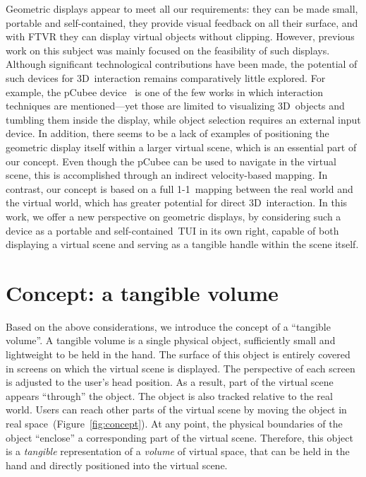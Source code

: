 \documentclass{vgtc}                         \havecopyrightspacefalse
\begin{document}
Geometric displays appear to meet all our requirements: they can be made small, portable and self-contained, they provide visual feedback on all their surface, and with FTVR they can display virtual objects without clipping. However, previous work on this subject was mainly focused on the feasibility of such displays. Although significant technological contributions have been made, the potential of such devices for 3D~interaction remains comparatively little explored. For example, the pCubee device~\cite{stavness10} is one of the few works in which interaction techniques are mentioned---yet those are limited to visualizing 3D~objects and tumbling them inside the display, while object selection requires an external input device. In addition, there seems to be a lack of examples of positioning the geometric display itself within a larger virtual scene, which is an essential part of our concept. Even though the pCubee can be used to navigate in the virtual scene, this is accomplished through an indirect velocity-based mapping. In contrast, our concept is based on a full 1-1~mapping between the real world and the virtual world, which has greater potential for direct 3D~interaction. In this work, we offer a new perspective on geometric displays, by considering such a device as a portable and self-contained~TUI in its own right, capable of both displaying a virtual scene and serving as a tangible handle within the scene itself.

\section{Concept: a tangible volume}

Based on the above considerations, we introduce the concept of a ``tangible volume''. A tangible volume is a single physical object, sufficiently small and lightweight to be held in the hand. The surface of this object is entirely covered in screens on which the virtual scene is displayed. The perspective of each screen is adjusted to the user's head position. As a result, part of the virtual scene appears ``through'' the object. The object is also tracked relative to the real world. Users can reach other parts of the virtual scene by moving the object in real space~(Figure~\ref{fig:concept}). At any point, the physical boundaries of the object ``enclose'' a corresponding part of the virtual scene. Therefore, this object is a \emph{tangible} representation of a \emph{volume} of virtual space, that can be held in the hand and directly positioned into the virtual scene.
\end{document}
